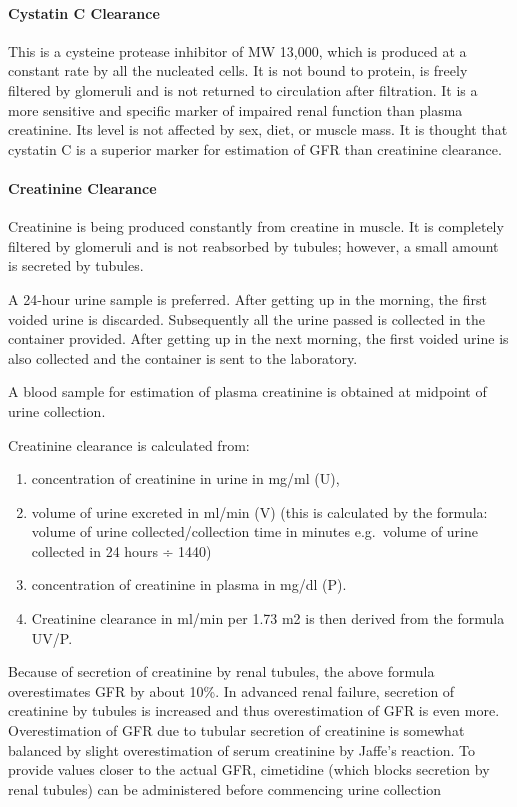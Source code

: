 \documentclass[
  letterpaper,
  DIV=11,
  numbers=noendperiod]{scrreprt}
\let\oldparagraph\paragraph
\renewcommand{\paragraph}[1]{\oldparagraph{#1}\mbox{}}
\begin{document}
\paragraph{Cystatin C Clearance}\label{cystatin-c-clearance}

This is a cysteine protease inhibitor of MW 13,000, which is produced at
a constant rate by all the nucleated cells. It is not bound to protein,
is freely filtered by glomeruli and is not returned to circulation after
filtration. It is a more sensitive and specific marker of impaired renal
function than plasma creatinine. Its level is not affected by sex, diet,
or muscle mass. It is thought that cystatin C is a superior marker for
estimation of GFR than creatinine clearance.

\paragraph{Creatinine Clearance}\label{creatinine-clearance}

Creatinine is being produced constantly from creatine in muscle. It is
completely filtered by glomeruli and is not reabsorbed by tubules;
however, a small amount is secreted by tubules.

A 24-hour urine sample is preferred. After getting up in the morning,
the first voided urine is discarded. Subsequently all the urine passed
is collected in the container provided. After getting up in the next
morning, the first voided urine is also collected and the container is
sent to the laboratory.

A blood sample for estimation of plasma creatinine is obtained at
midpoint of urine collection.

Creatinine clearance is calculated from:

\begin{enumerate}
\def\labelenumi{\arabic{enumi}.}
\item
  concentration of creatinine in urine in mg/ml (U),
\item
  volume of urine excreted in ml/min (V) (this is calculated by the
  formula: volume of urine collected/collection time in minutes
  e.g.~volume of urine collected in 24 hours ÷ 1440)
\item
  concentration of creatinine in plasma in mg/dl (P).
\item
  Creatinine clearance in ml/min per 1.73 m2 is then derived from the
  formula UV/P.
\end{enumerate}

Because of secretion of creatinine by renal tubules, the above formula
overestimates GFR by about 10\%. In advanced renal failure, secretion of
creatinine by tubules is increased and thus overestimation of GFR is
even more. Overestimation of GFR due to tubular secretion of creatinine
is somewhat balanced by slight overestimation of serum creatinine by
Jaffe's reaction. To provide values closer to the actual GFR, cimetidine
(which blocks secretion by renal tubules) can be administered before
commencing urine collection
\end{document}
